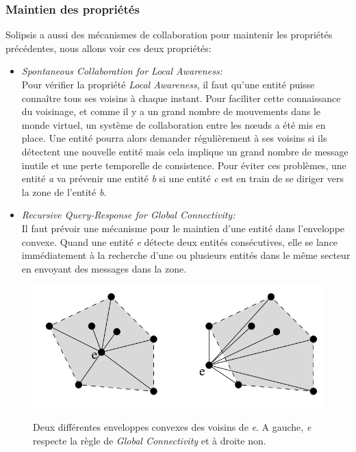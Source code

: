 		\subsubsection{Maintien des propriétés}
Solipsis a aussi des mécanismes de collaboration pour maintenir les propriétés précédentes, nous allons voir ces deux propriétés:
	\begin{itemize}
	\renewcommand{\labelitemi}{$\bullet$}
		\item \textit{Spontaneous Collaboration for Local Awareness:}\\
		 Pour vérifier la propriété \textit{Local Awareness}, il faut qu'une entité puisse connaître tous ses voisins à chaque instant. Pour faciliter cette connaissance du voisinage, et comme il y a un grand nombre de mouvements dans le monde virtuel, un système de collaboration entre les nœuds a été mis en place. Une entité pourra alors demander régulièrement à ses voisins si ils détectent une nouvelle entité mais cela implique un grand nombre de message inutile et une perte temporelle de consistence. Pour éviter ces problèmes, une entité \textit{a} va prévenir une entité \textit{b} si une entité \textit{c} est en train de se diriger vers la zone de l'entité \textit{b}.
		\item \textit{Recursive Query-Response for Global Connectivity:}\\
		Il faut prévoir une mécanisme pour le maintien d'une entité dans l'enveloppe convexe. Quand une entité \textit{e} détecte deux entités consécutives, elle se lance immédiatement à la recherche d'une ou plusieurs entités dans le même secteur en envoyant des messages dans la zone. \\ 
	\end{itemize}
        \vspace{1cm}
        \begin{figure}[!h]
	\centering
        \includegraphics[scale=0.9]{../Images/envelop_convex1.png}\\
        \caption{Deux différentes enveloppes convexes des voisins de \textit{e}. A gauche, \textit{e} respecte la règle de \textit{Global Connectivity} et à droite non.}
        \label{Envelop_Convex}
        \end{figure}
